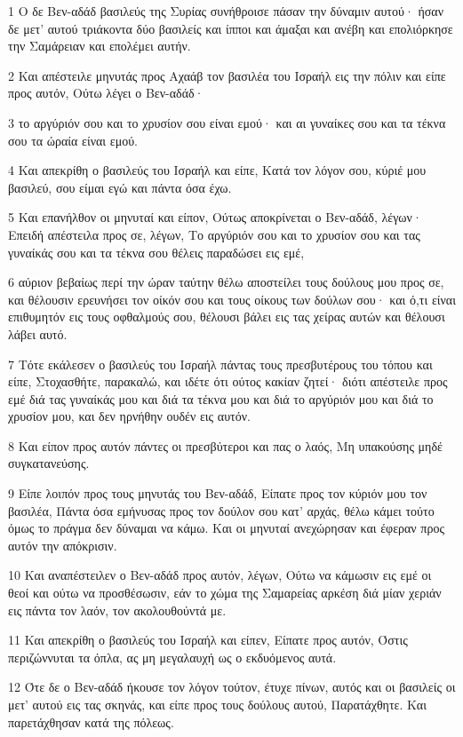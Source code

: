 \par 1 Ο δε Βεν-αδάδ βασιλεύς της Συρίας συνήθροισε πάσαν την δύναμιν αυτού· ήσαν δε μετ' αυτού τριάκοντα δύο βασιλείς και ίπποι και άμαξαι και ανέβη και επολιόρκησε την Σαμάρειαν και επολέμει αυτήν.
\par 2 Και απέστειλε μηνυτάς προς Αχαάβ τον βασιλέα του Ισραήλ εις την πόλιν και είπε προς αυτόν, Ούτω λέγει ο Βεν-αδάδ·
\par 3 το αργύριόν σου και το χρυσίον σου είναι εμού· και αι γυναίκες σου και τα τέκνα σου τα ώραία είναι εμού.
\par 4 Και απεκρίθη ο βασιλεύς του Ισραήλ και είπε, Κατά τον λόγον σου, κύριέ μου βασιλεύ, σου είμαι εγώ και πάντα όσα έχω.
\par 5 Και επανήλθον οι μηνυταί και είπον, Ούτως αποκρίνεται ο Βεν-αδάδ, λέγων· Επειδή απέστειλα προς σε, λέγων, Το αργύριόν σου και το χρυσίον σου και τας γυναίκάς σου και τα τέκνα σου θέλεις παραδώσει εις εμέ,
\par 6 αύριον βεβαίως περί την ώραν ταύτην θέλω αποστείλει τους δούλους μου προς σε, και θέλουσιν ερευνήσει τον οίκόν σου και τους οίκους των δούλων σου· και ό,τι είναι επιθυμητόν εις τους οφθαλμούς σου, θέλουσι βάλει εις τας χείρας αυτών και θέλουσι λάβει αυτό.
\par 7 Τότε εκάλεσεν ο βασιλεύς του Ισραήλ πάντας τους πρεσβυτέρους του τόπου και είπε, Στοχασθήτε, παρακαλώ, και ιδέτε ότι ούτος κακίαν ζητεί· διότι απέστειλε προς εμέ διά τας γυναίκάς μου και διά τα τέκνα μου και διά το αργύριόν μου και διά το χρυσίον μου, και δεν ηρνήθην ουδέν εις αυτόν.
\par 8 Και είπον προς αυτόν πάντες οι πρεσβύτεροι και πας ο λαός, Μη υπακούσης μηδέ συγκατανεύσης.
\par 9 Είπε λοιπόν προς τους μηνυτάς του Βεν-αδάδ, Είπατε προς τον κύριόν μου τον βασιλέα, Πάντα όσα εμήνυσας προς τον δούλον σου κατ' αρχάς, θέλω κάμει τούτο όμως το πράγμα δεν δύναμαι να κάμω. Και οι μηνυταί ανεχώρησαν και έφεραν προς αυτόν την απόκρισιν.
\par 10 Και αναπέστειλεν ο Βεν-αδάδ προς αυτόν, λέγων, Ούτω να κάμωσιν εις εμέ οι θεοί και ούτω να προσθέσωσιν, εάν το χώμα της Σαμαρείας αρκέση διά μίαν χεριάν εις πάντα τον λαόν, τον ακολουθούντά με.
\par 11 Και απεκρίθη ο βασιλεύς του Ισραήλ και είπεν, Είπατε προς αυτόν, Όστις περιζώννυται τα όπλα, ας μη μεγαλαυχή ως ο εκδυόμενος αυτά.
\par 12 Ότε δε ο Βεν-αδάδ ήκουσε τον λόγον τούτον, έτυχε πίνων, αυτός και οι βασιλείς οι μετ' αυτού εις τας σκηνάς, και είπε προς τους δούλους αυτού, Παρατάχθητε. Και παρετάχθησαν κατά της πόλεως.
